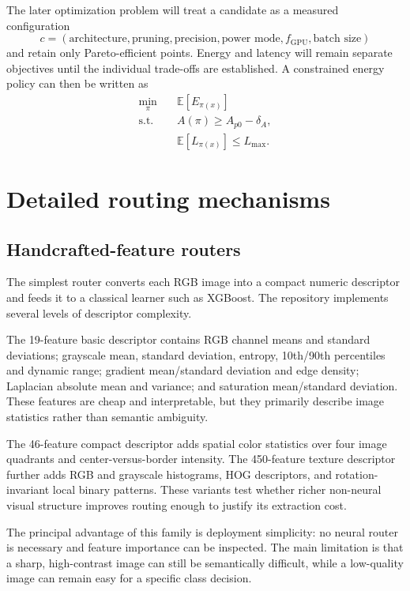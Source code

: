 \documentclass[11pt,a4paper]{article}
\begin{document}
The later optimization problem will treat a candidate as a measured configuration
\[
c=(\text{architecture},\text{pruning},\text{precision},\text{power mode},f_{\mathrm{GPU}},\text{batch size})
\]
and retain only Pareto-efficient points. Energy and latency will remain separate objectives until the individual trade-offs are established. A constrained energy policy can then be written as
\begin{align}
\min_{\pi} \quad & \mathbb{E}[E_{\pi(x)}] \\
\text{s.t.}\quad & A(\pi) \geq A_{p0}-\delta_A, \\
& \mathbb{E}[L_{\pi(x)}] \leq L_{\max}.
\end{align}

\appendix

\section{Detailed routing mechanisms}
\label{app:routing}

\subsection{Handcrafted-feature routers}

The simplest router converts each RGB image into a compact numeric descriptor and feeds it to a classical learner such as XGBoost. The repository implements several levels of descriptor complexity.

The 19-feature basic descriptor contains RGB channel means and standard deviations; grayscale mean, standard deviation, entropy, 10th/90th percentiles and dynamic range; gradient mean/standard deviation and edge density; Laplacian absolute mean and variance; and saturation mean/standard deviation. These features are cheap and interpretable, but they primarily describe image statistics rather than semantic ambiguity.

The 46-feature compact descriptor adds spatial color statistics over four image quadrants and center-versus-border intensity. The 450-feature texture descriptor further adds RGB and grayscale histograms, HOG descriptors, and rotation-invariant local binary patterns. These variants test whether richer non-neural visual structure improves routing enough to justify its extraction cost.

The principal advantage of this family is deployment simplicity: no neural router is necessary and feature importance can be inspected. The main limitation is that a sharp, high-contrast image can still be semantically difficult, while a low-quality image can remain easy for a specific class decision.
\end{document}
